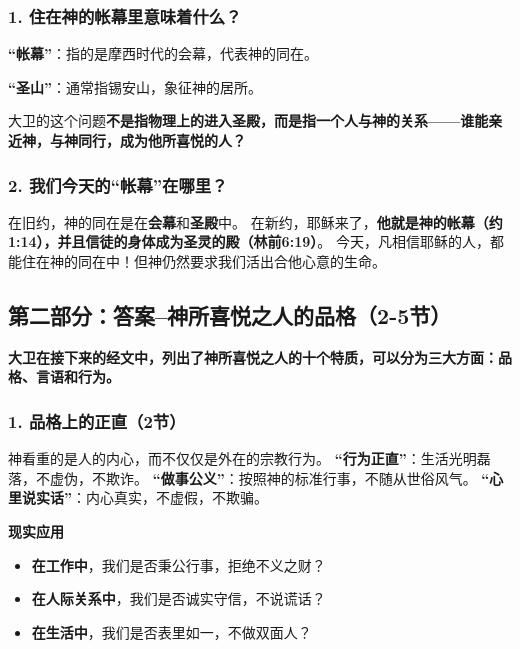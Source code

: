 \documentclass[a4paper, 12pt]{article}
\begin{document}
\subsubsection*{1. 住在神的帐幕里意味着什么？  }

\hspace{0.4cm}\textbf{“帐幕”}：指的是摩西时代的会幕，代表神的同在。

\textbf{“圣山”}：通常指锡安山，象征神的居所。  

大卫的这个问题\textbf{不是指物理上的进入圣殿，而是指一个人与神的关系——谁能亲近神，与神同行，成为他所喜悦的人？}  

\subsubsection*{2. 我们今天的“帐幕”在哪里？}

在旧约，神的同在是在\textbf{会幕}和\textbf{圣殿}中。  
在新约，耶稣来了，\textbf{他就是神的帐幕（约1:14），并且信徒的身体成为圣灵的殿（林前6:19）}。  
今天，凡相信耶稣的人，都能住在神的同在中！但神仍然要求我们活出合他心意的生命。  


\subsection*{第二部分：答案--神所喜悦之人的品格（2-5节）}

\textbf{大卫在接下来的经文中，列出了神所喜悦之人的十个特质，可以分为三大方面：品格、言语和行为。
}


\subsubsection*{1. 品格上的正直（2节）}

神看重的是人的内心，而不仅仅是外在的宗教行为。
\textbf{“行为正直”}：生活光明磊落，不虚伪，不欺诈。  
\textbf{“做事公义”}：按照神的标准行事，不随从世俗风气。  
\textbf{“心里说实话”}：内心真实，不虚假，不欺骗。 
\vspace{0.2cm}

\textbf{现实应用} 

\begin{itemize}
    \item \textbf{在工作中}，我们是否秉公行事，拒绝不义之财？  

    \item \textbf{在人际关系中}，我们是否诚实守信，不说谎话？  

    \item \textbf{在生活中}，我们是否表里如一，不做双面人？  

\end{itemize}
\end{document}
